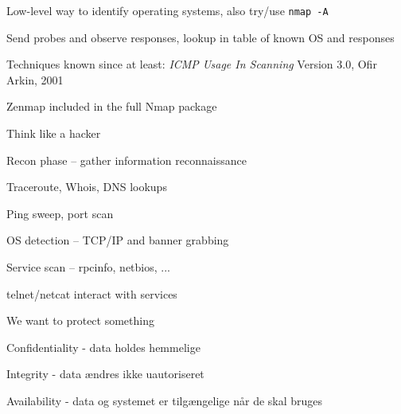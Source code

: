 \documentclass[Screen16to9,17pt]{foils}
\begin{document}
\begin{list2}
\item Low-level way to identify operating systems, also try/use
  \verb+nmap -A+
\item Send probes and observe responses, lookup in table of known OS and responses
\item Techniques known since at least: \emph{ICMP Usage In Scanning} Version 3.0,
  Ofir Arkin, 2001 %
\end{list2}


\centerline{Zenmap included in the full Nmap package }



\begin{list1}
\item Think like a hacker
\item Recon phase -- gather information reconnaissance
\begin{list2}
\item Traceroute, Whois, DNS lookups
\item Ping sweep, port scan
\item OS detection -- TCP/IP and banner grabbing
\item Service scan -- rpcinfo, netbios, ...
\item telnet/netcat interact with services
\end{list2}
\end{list1}







\begin{list1}
\item We want to protect something
\item Confidentiality - data holdes hemmelige
\item Integrity - data ændres ikke uautoriseret
\item Availability - data og systemet er tilgængelige når de skal bruges
\end{list1}
\end{document}
